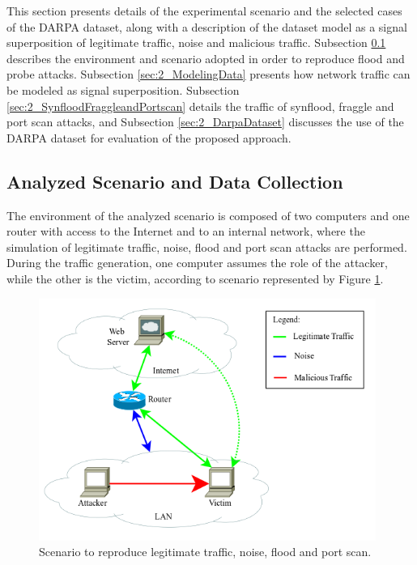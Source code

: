 This section presents details of the experimental scenario and the selected cases of the DARPA dataset, along with a description of the dataset model as a signal superposition of legitimate traffic, noise and malicious traffic. Subsection \ref{sec:2_DataCollection} describes the environment and scenario adopted in order to reproduce flood and probe attacks. Subsection \ref{sec:2_ModelingData} presents how network traffic can be modeled as signal superposition. Subsection \ref{sec:2_SynfloodFraggleandPortscan} details the traffic of synflood, fraggle and port scan attacks, and Subsection \ref{sec:2_DarpaDataset} discusses the use of the DARPA dataset for evaluation of the proposed approach.

\subsection{Analyzed Scenario and Data Collection}
\label{sec:2_DataCollection}

The environment of the analyzed scenario is composed of two computers and one router with access to the Internet and to an internal network, where the simulation of legitimate traffic, noise, flood and port scan attacks are performed. During the traffic generation, one computer assumes the role of the attacker, while the other is the victim, according to scenario represented by Figure \ref{fig:2_fig1}.

\begin{figure}[h!]
     \centering 
     \includegraphics[width=11cm]{figures/fig09.png}
     \caption{Scenario to reproduce legitimate traffic, noise, flood and port scan.}
     \label{fig:2_fig1}
\end{figure}

